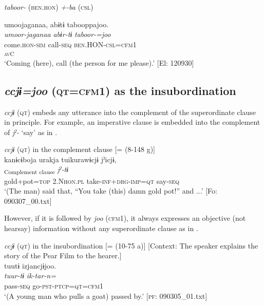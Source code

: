   \textit{taboor-} (\textsc{ben}.\textsc{hon}) \textit{+-ba} (\textsc{csl})

  \ex  
      \gllll    umoojaganaa,  abɨtɨ  tabooppajoo.\\
      \textit{umoor-jaganaa}  \textit{abɨr-tɨ}  \textit{taboor-=joo}\\
      come.\textsc{hon}-\textsc{sim}  call-\textsc{seq}  \textsc{ben}.HON-\textsc{csl}=\textsc{cfm}1\\
        [Lex. verb  Aux. verb]\textsubscript{\textsc{av}C}\\
      \glt ‘Coming (here), call (the person for me please).’      [El: 120930]
\z
\z

\subsection{\textit{ccjɨ=joo} (\textsc{qt}=\textsc{cfm}1) as the insubordination}\label{sec:11.2.3}

\textit{ccjɨ} (\textsc{qt}) embeds any utterance into the complement of the superordinate clause in principle. For example, an imperative clause is embedded into the complement of \textit{jˀ-} ‘say’ as in .

\ea\label{ex:11-10}  \textit{ccjɨ} (\textsc{qt}) in the complement clause [= (8-148 g)]\\
  
      \glll    kanɨcɨboja  urakja  tuikurawɨcjɨ  jˀicjɨ,\\
    [\textit{kanɨ+cɨbo=ja}  \textit{urakja}  \textit{tur-i+kuraw-ɨ=\Highlight{ccjɨ}}]\textsubscript{Complement clause}  \textit{jˀ-tɨ}\\
    gold+pot=\textsc{top}  2.N\textsc{hon}.\textsc{pl}  take-\textsc{inf}+\textsc{drg}-\textsc{imp}=\textsc{qt}  say-\textsc{seq}\\
    \glt     ‘(The man) said that, “You take (this) damn gold pot!” and ...’ [Fo: 090307\_00.txt]
\z

However, if it is followed by \textit{joo} (\textsc{cfm}1), it always expresses an objective (not hearsay) information without any superordinate clause as in .

\ea\label{ex:11-11}  \textit{ccjɨ} (\textsc{qt}) in the insubordination [= (10-75 a)]   [Context: The speaker explains the story of the Pear Film to the hearer.]\\
  
      \glll    tuutɨ  izjancjɨjoo.\\
    \textit{tuur-tɨ}  \textit{ik-tar-n=}\\
    pass-\textsc{seq}  go-\textsc{pst}-\textsc{ptcp}=\textsc{qt}=\textsc{cfm}1\\
    \glt     ‘(A young man who pulls a goat) passed by.’ [\textsc{pf}: 090305\_01.txt]
\z


